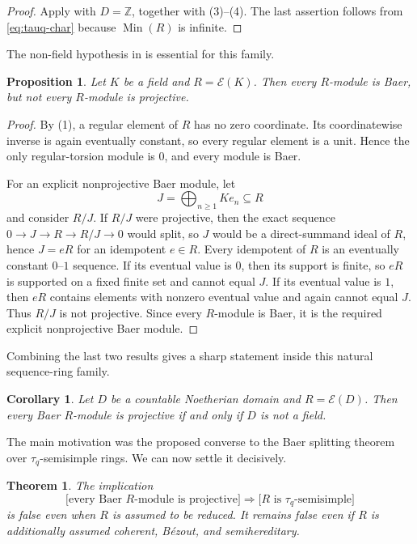 \documentclass[11pt]{article}
\newtheorem{theorem}{Theorem}[section]
\newtheorem{proposition}[proposition]{Proposition}
\newtheorem{corollary}[corollary]{Corollary}
\theoremstyle{definition}
\theoremstyle{remark}
\newcommand{\Min}{\operatorname{Min}}
\newcommand{\EC}{\mathcal E}
\begin{document}
\begin{proof}
Apply  with $D=\mathbb Z$, together with
(3)--(4).  The last assertion follows from
\eqref{eq:tauq-char} because $\Min(R)$ is infinite.
\end{proof}

The non-field hypothesis in  is essential for this family.

\begin{proposition}\label{prop:field}
Let $K$ be a field and $R=\EC(K)$.  Then every $R$-module is Baer, but not every
$R$-module is projective.
\end{proposition}

\begin{proof}
By (1), a regular element of $R$ has no zero coordinate.
Its coordinatewise inverse is again eventually constant, so every regular
element is a unit.  Hence the only regular-torsion module is $0$, and every
module is Baer.

For an explicit nonprojective Baer module, let
\[
 J=\bigoplus_{n\ge1}Ke_n\subseteq R
\]
and consider $R/J$.  If $R/J$ were projective, then the exact sequence
$0\to J\to R\to R/J\to0$ would split, so $J$ would be a direct-summand ideal
of $R$, hence $J=eR$ for an idempotent $e\in R$.  Every idempotent of $R$ is
an eventually constant $0$--$1$ sequence.  If its eventual value is $0$, then
its support is finite, so $eR$ is supported on a fixed finite set and cannot
equal $J$.  If its eventual value is $1$, then $eR$ contains elements with
nonzero eventual value and again cannot equal $J$.  Thus $R/J$ is not
projective.  Since every $R$-module is Baer, it is the required explicit
nonprojective Baer module.
\end{proof}

Combining the last two results gives a sharp statement inside this natural
sequence-ring family.

\begin{corollary}\label{cor:dichotomy}
Let $D$ be a countable Noetherian domain and $R=\EC(D)$.  Then every Baer
$R$-module is projective if and only if $D$ is not a field.
\end{corollary}



The main motivation was the proposed converse to the Baer splitting theorem
over $\tau_q$-semisimple rings.  We can now settle it decisively.

\begin{theorem}\label{thm:conjecturefalse}
The implication
\[
 \bigl[\text{every Baer $R$-module is projective}\bigr]
 \Longrightarrow
 \bigl[R\text{ is $\tau_q$-semisimple}\bigr]
\]
is false even when $R$ is assumed to be reduced.  It remains false even if
$R$ is additionally assumed coherent, B\'ezout, and semihereditary.
\end{theorem}
\end{document}
